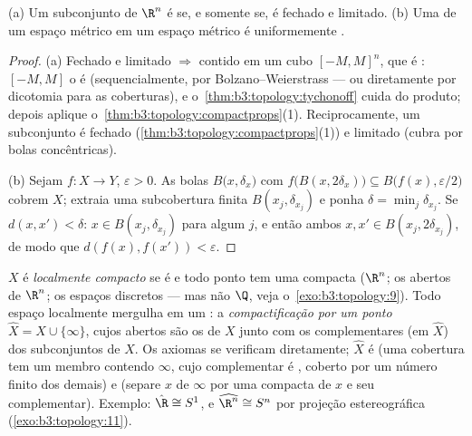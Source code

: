\begin{corollary}
\label{cor:b3:topology:heineborel}
(a) Um subconjunto de $\R^n$ é  se, e somente se, é fechado
e limitado.
(b) Uma  de um espaço métrico  em um espaço
métrico é uniformemente .
\end{corollary}

\begin{proof}
(a) Fechado e limitado $\Rightarrow$ contido em um cubo $[-M,M]^n$, que é :
$[-M, M]$ o é (sequencialmente, por Bolzano--Weierstrass --- ou diretamente
por dicotomia para as coberturas), e o~\cref{thm:b3:topology:tychonoff} cuida do produto;
depois aplique o~\cref{thm:b3:topology:compactprops}(1). Reciprocamente, um subconjunto
 é fechado (\cref{thm:b3:topology:compactprops}(1)) e limitado (cubra por bolas
concêntricas).

(b) Sejam $f \colon X \to Y$, $\varepsilon > 0$. As bolas $B\bigl(x, \delta_x\bigr)$ com $f\bigl(B(x,
2\delta_x)\bigr)\subseteq B\bigl(f(x), \varepsilon/2\bigr)$ cobrem $X$;
extraia uma subcobertura finita $B(x_j, \delta_{x_j})$ e ponha $\delta = \min_j \delta_{x_j}$. Se $d(x, x') < \delta$: $x
\in B(x_j, \delta_{x_j})$
para algum $j$, e então ambos $x, x'
\in B(x_j, 2\delta_{x_j})$, de modo que $d(f(x), f(x')) < \varepsilon$.
\end{proof}

\begin{definition}\label{def:b3:topology:locallycompact}
$X$ é \emph{localmente compacto}
se é  e todo ponto tem uma  compacta ($\R^n$;
os abertos de $\R^n$; os espaços discretos --- mas não $\Q$,
veja o~\cref{exo:b3:topology:9}). Todo espaço localmente  mergulha em um
: a \emph{compactificação por um ponto} $\hat X = X
\cup \{\infty\}$, cujos abertos são os de $X$ junto com os
complementares (em $\hat X$) dos subconjuntos  de $X$.
Os axiomas se verificam diretamente; $\hat X$ é  (uma
cobertura tem um membro contendo $\infty$, cujo complementar é
, coberto por um número finito dos demais) e 
(separe $x$ de $\infty$ por uma  compacta de $x$ e
seu complementar). Exemplo: $\hat\R \cong S^1$, e $\widehat{\R^n} \cong S^n$ por projeção estereográfica
(\cref{exo:b3:topology:11}).
\end{definition}

